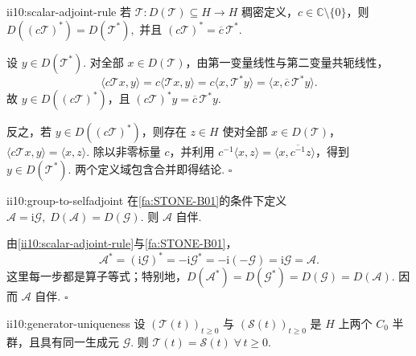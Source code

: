 \begin{FALemma}[B][非零标量与无界伴随]{ii10:scalar-adjoint-rule}
若 \(\displaystyle\mathcal T:D(\mathcal T)\subseteq H\to H\) 稠密定义，\(\displaystyle c\in\mathbb C\setminus\{0\}\)，则 \(\displaystyle D((c\mathcal T)^*)=D(\mathcal T^*),\)
并且 \(\displaystyle (c\mathcal T)^*=\overline c\,\mathcal T^*.\)
\end{FALemma}

\begin{FAProof}
设 \(\displaystyle y\in D(\mathcal T^*)\). 对全部 \(\displaystyle x\in D(\mathcal T)\)，由第一变量线性与第二变量共轭线性，
\[
\langle c\mathcal Tx,y\rangle
=
c\langle\mathcal Tx,y\rangle
=
c\langle x,\mathcal T^*y\rangle
=
\langle x,\overline c\,\mathcal T^*y\rangle.
\]
故 \(\displaystyle y\in D((c\mathcal T)^*)\)，且 \(\displaystyle(c\mathcal T)^*y=\overline c\,\mathcal T^*y\).

反之，若 \(\displaystyle y\in D((c\mathcal T)^*)\)，则存在 \(\displaystyle z\in H\) 使对全部 \(\displaystyle x\in D(\mathcal T)\)， \(\displaystyle \langle c\mathcal Tx,y\rangle=\langle x,z\rangle.\)
除以非零标量 \(\displaystyle c\)，并利用 \(\displaystyle c^{-1}\langle x,z\rangle=\langle x,\overline{c^{-1}}z\rangle\)，得到 \(\displaystyle y\in D(\mathcal T^*)\). 两个定义域包含合并即得结论.
\hfill\(\square\)
\end{FAProof}

\begin{FAProposition}{ii10:group-to-selfadjoint}
在\autoref{fa:STONE-B01}的条件下定义 \(\displaystyle \mathcal A=\mathrm{i}\mathcal G, \; D(\mathcal A)=D(\mathcal G).\)
则 \(\displaystyle\mathcal A\) 自伴.
\end{FAProposition}

\begin{FAProof}
由\autoref{ii10:scalar-adjoint-rule}与\autoref{fa:STONE-B01}，
\[
\mathcal A^*
=
(\mathrm{i}\mathcal G)^*
=
-\mathrm{i}\mathcal G^*
=
-\mathrm{i}(-\mathcal G)
=
\mathrm{i}\mathcal G
=
\mathcal A.
\]
这里每一步都是算子等式；特别地，\(\displaystyle D(\mathcal A^*)=D(\mathcal G^*)=D(\mathcal G)=D(\mathcal A)\). 因而 \(\displaystyle\mathcal A\) 自伴.
\hfill\(\square\)
\end{FAProof}

\begin{FALemma}{ii10:generator-uniqueness}
设 \(\displaystyle(\mathcal T(t))_{t\geqslant0}\) 与 \(\displaystyle(\mathcal S(t))_{t\geqslant0}\) 是 \(\displaystyle H\) 上两个 \(\displaystyle C_0\) 半群，且具有同一生成元 \(\displaystyle\mathcal G\). 则 \(\displaystyle \mathcal T(t)=\mathcal S(t) \; \forall\,t\geqslant0.\)
\end{FALemma}

